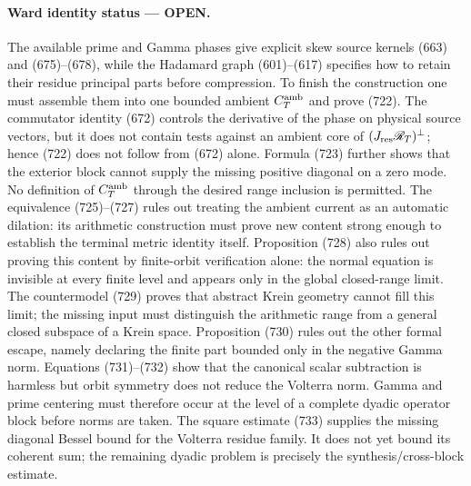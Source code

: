 \documentclass[11pt]{article}
\newcommand{\OPEN}{\textcolor{red!70!black}{\textbf{OPEN}}}
\begin{document}
\paragraph{Ward identity status --- \OPEN.}
The available prime and Gamma phases give explicit skew source kernels
(663) and (675)--(678), while the Hadamard graph (601)--(617) specifies how
to retain their residue principal parts before compression.  To finish the
construction one must assemble them into one bounded ambient
\(C_T^{\rm amb}\) and prove (722).  The commutator identity (672) controls
the derivative of the phase on physical source vectors, but it does not
contain tests against an ambient core of
\((J_{\rm res}\mathscr R_T)^\perp\); hence (722) does not follow from
(672) alone.  Formula (723) further shows that the exterior block cannot
supply the missing positive diagonal on a zero mode.  No definition of
\(C_T^{\rm amb}\) through the desired range inclusion is permitted.
The equivalence (725)--(727) rules out treating the ambient current as an
automatic dilation: its arithmetic construction must prove new content
strong enough to establish the terminal metric identity itself.
Proposition (728) also rules out proving this content by finite-orbit
verification alone: the normal equation is invisible at every finite
level and appears only in the global closed-range limit.
The countermodel (729) proves that abstract Krein geometry cannot fill this
limit; the missing input must distinguish the arithmetic range from a
general closed subspace of a Krein space.
Proposition (730) rules out the other formal escape, namely declaring the
finite part bounded only in the negative Gamma norm.
Equations (731)--(732) show that the canonical scalar subtraction is
harmless but orbit symmetry does not reduce the Volterra norm.  Gamma and
prime centering must therefore occur at the level of a complete dyadic
operator block before norms are taken.
The square estimate (733) supplies the missing diagonal Bessel bound for
the Volterra residue family.  It does not yet bound its coherent sum; the
remaining dyadic problem is precisely the synthesis/cross-block estimate.
\end{document}
